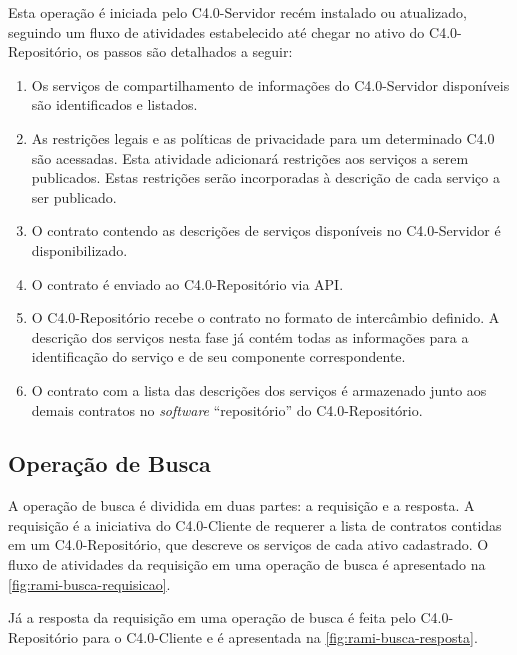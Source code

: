 Esta operação é iniciada pelo C4.0-Servidor recém instalado ou atualizado, seguindo um fluxo de atividades estabelecido até chegar no ativo do C4.0-Repositório, os passos são detalhados a seguir:

\begin{enumerate}

	\item Os serviços de compartilhamento de informações do C4.0-Servidor disponíveis são identificados e listados.

	\item As restrições legais e as políticas de privacidade para um determinado C4.0 são acessadas. Esta atividade adicionará restrições aos serviços a serem publicados. Estas restrições serão incorporadas à descrição de cada serviço a ser publicado.

	\item O contrato contendo as descrições de serviços disponíveis no C4.0-Servidor é disponibilizado.

	\item O contrato é enviado ao C4.0-Repositório via API.

	\item O C4.0-Repositório recebe o contrato no formato de intercâmbio definido. A descrição dos serviços nesta fase já contém todas as informações para a identificação do serviço e de seu componente correspondente.

	\item O contrato com a lista das descrições dos serviços é armazenado junto aos demais contratos no \textit{software} ``repositório'' do C4.0-Repositório.

\end{enumerate}

\subsection{Operação de Busca}

A operação de busca é dividida em duas partes: a requisição e a resposta. A requisição é a iniciativa do C4.0-Cliente de requerer a lista de contratos contidas em um C4.0-Repositório, que descreve os serviços de cada ativo cadastrado. O fluxo de atividades da requisição em uma operação de busca é apresentado na \autoref{fig:rami-busca-requisicao}.

Já a resposta da requisição em uma operação de busca é feita pelo C4.0-Repositório para o C4.0-Cliente e é apresentada na \autoref{fig:rami-busca-resposta}.

